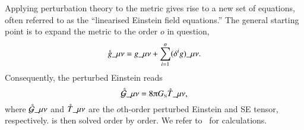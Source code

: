 {

\newcommand{\pert}{\ALIASpert}           %




Applying perturbation theory to the metric gives rise to a new set of equations, often referred to as the ``linearised Einstein field equations.'' The general starting point is to expand the metric to the order $o$ in question,
\begin{equation}
    \pert{g}\_{\mu\nu} = g\_{\mu\nu}+ \sum_{i=1}^{o} (\delta^{i}g)\_{\mu\nu}.
\end{equation}
Consequently, the perturbed Einstein reads
\begin{equation}\label{eq:GR:einstein:linearised_Einstein_eq}
    \pert{\mathcal{G}}\_{\mu\nu} = 8\ppi G\nped{N} \pert{T}\_{\mu\nu},
\end{equation}
where $\pert{\mathcal{G}}\_{\mu\nu}$ and $\pert{T}\_{\mu\nu}$ are the $o$th-order perturbed Einstein and SE tensor, respectively.  is then solved order by order. We refer to~\citet{jokelaGravitationalWaveMemory2022,maggioreGravitationalWavesVol2007,carrollSpacetimeGeometryIntroduction2019} for calculations. 

}
